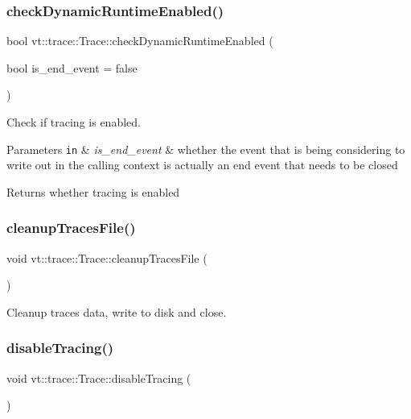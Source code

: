 \subsubsection{\texorpdfstring{check\+Dynamic\+Runtime\+Enabled()}{checkDynamicRuntimeEnabled()}}
{\footnotesize\ttfamily bool vt\+::trace\+::\+Trace\+::check\+Dynamic\+Runtime\+Enabled (\begin{DoxyParamCaption}\item[{bool}]{is\+\_\+end\+\_\+event = {\ttfamily false} }\end{DoxyParamCaption})}



Check if tracing is enabled. 


\begin{DoxyParams}[1]{Parameters}
\mbox{\tt in}  & {\em is\+\_\+end\+\_\+event} & whether the event that is being considering to write out in the calling context is actually an end event that needs to be closed\\
\hline
\end{DoxyParams}
\begin{DoxyReturn}{Returns}
whether tracing is enabled 
\end{DoxyReturn}
\mbox{\label{structvt_1_1trace_1_1_trace_ac764c356a7f81abadfe643d618f22b15}} 
\subsubsection{\texorpdfstring{cleanup\+Traces\+File()}{cleanupTracesFile()}}
{\footnotesize\ttfamily void vt\+::trace\+::\+Trace\+::cleanup\+Traces\+File (\begin{DoxyParamCaption}{ }\end{DoxyParamCaption})}



Cleanup traces data, write to disk and close. 

\mbox{\label{structvt_1_1trace_1_1_trace_a54f34dbcf8960de7b319e44ef9b76eb0}} 
\subsubsection{\texorpdfstring{disable\+Tracing()}{disableTracing()}}
{\footnotesize\ttfamily void vt\+::trace\+::\+Trace\+::disable\+Tracing (\begin{DoxyParamCaption}{ }\end{DoxyParamCaption})}



